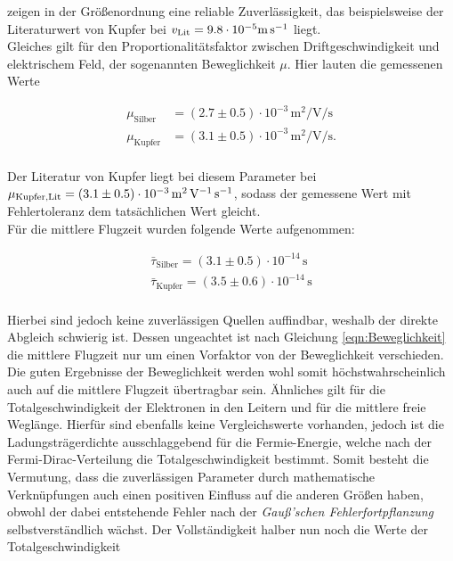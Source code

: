 \noindent zeigen in der Größenordnung eine reliable Zuverlässigkeit, das beispielsweise der Literaturwert von Kupfer bei 
$v_\text{Lit} = 9.8\cdot{}10^{-5}\unit[per-mode=reciprocal]{\meter\per\second}$ liegt.\\

\noindent Gleiches gilt für den Proportionalitätsfaktor zwischen Driftgeschwindigkeit und elektrischem Feld, der 
sogenannten Beweglichkeit $\mu$. Hier lauten die gemessenen Werte 

\begin{align*}
    \mu_\text{Silber} &= \left(2.7 \pm0.5\right)\cdot{}10^{-3}\,\unit{\square\meter\per\volt\per\second}\\
    \mu_\text{Kupfer} &= \left(3.1 \pm0.5\right)\cdot{}10^{-3}\,\unit{\square\meter\per\volt\per\second}.\\
\end{align*}

\noindent Der Literatur von Kupfer liegt bei diesem Parameter bei $\mu_\text{Kupfer,Lit} = \left(3.1 \pm0.5\right)
\cdot{}10^{-3}\,\unit[per-mode=reciprocal]{\square\meter\per\volt\per\second}$, sodass der gemessene Wert mit Fehlertoleranz dem tatsächlichen 
Wert gleicht.\\

\noindent Für die mittlere Flugzeit wurden folgende Werte aufgenommen:

\begin{align*}
    \bar{\tau}_\text{Silber} = \left(3.1\pm0.5\right)\cdot10^{-14}\,\unit{\second}\\
    \bar{\tau}_\text{Kupfer} = \left(3.5\pm0.6\right)\cdot10^{-14}\,\unit{\second}\\
\end{align*}

\noindent Hierbei sind jedoch keine zuverlässigen Quellen auffindbar, weshalb der direkte Abgleich schwierig ist. 
Dessen ungeachtet ist nach Gleichung \eqref{eqn:Beweglichkeit} die mittlere Flugzeit nur um einen Vorfaktor von der 
Beweglichkeit verschieden. Die guten Ergebnisse der Beweglichkeit werden wohl somit höchstwahrscheinlich auch auf die 
mittlere Flugzeit übertragbar sein. Ähnliches gilt für die Totalgeschwindigkeit der Elektronen in den Leitern und für 
die mittlere freie Weglänge. Hierfür sind ebenfalls keine Vergleichswerte vorhanden, jedoch ist die Ladungsträgerdichte 
ausschlaggebend für die Fermie-Energie, welche nach der Fermi-Dirac-Verteilung die Totalgeschwindigkeit bestimmt. Somit 
besteht die Vermutung, dass die zuverlässigen Parameter durch mathematische Verknüpfungen auch einen positiven Einfluss 
auf die anderen Größen haben, obwohl der dabei entstehende Fehler nach der \emph{Gauß'schen Fehlerfortpflanzung} 
selbstverständlich wächst. Der Vollständigkeit halber nun noch die Werte der Totalgeschwindigkeit

